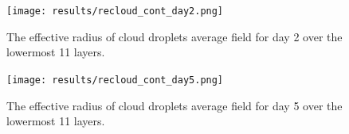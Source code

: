 
\begin{figure}[h]
\centering
\texttt{[image: results/recloud\_cont\_day2.png]}
\caption{The effective radius of cloud droplets average field for day 2 over the lowermost 11 layers.}
\label{fig:recloud_r1Day2}
\end{figure}

\begin{figure}[h]
\centering
\texttt{[image: results/recloud\_cont\_day5.png]}
\caption{The effective radius of cloud droplets average field for day 5 over the lowermost 11 layers.}
\label{fig:recloud_r1Day5}
\end{figure}

